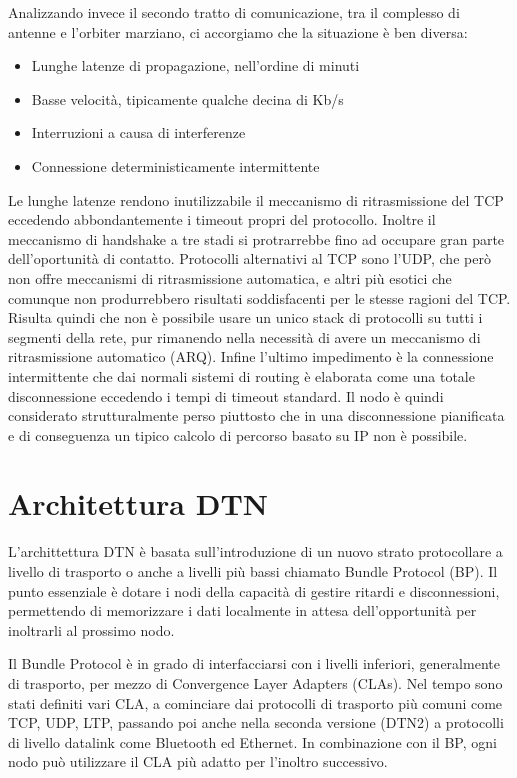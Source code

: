 \documentclass[12pt,a4paper,oneside]{book}
\begin{document}
		Analizzando invece il secondo tratto di comunicazione, tra il complesso di antenne e l'orbiter marziano, ci accorgiamo che la situazione è ben diversa:
		\begin{itemize}
			\item Lunghe latenze di propagazione, nell'ordine di minuti
			\item Basse velocità, tipicamente qualche decina di Kb/s
			\item Interruzioni a causa di interferenze
			\item Connessione deterministicamente intermittente
		\end{itemize}
		Le lunghe latenze rendono inutilizzabile il meccanismo di ritrasmissione del TCP eccedendo abbondantemente i timeout propri del protocollo. Inoltre il meccanismo di handshake a tre stadi si protrarrebbe fino ad occupare gran parte dell'oportunità di contatto. Protocolli alternativi al TCP sono l'UDP, che però non offre meccanismi di ritrasmissione automatica, e altri più esotici che comunque non produrrebbero risultati soddisfacenti per le stesse ragioni del TCP.
		Risulta quindi che non è possibile usare un unico stack di protocolli su tutti i segmenti della rete, pur rimanendo nella necessità di avere un meccanismo di ritrasmissione automatico (ARQ). 
		Infine l'ultimo impedimento è la connessione intermittente che dai normali sistemi di routing è elaborata come una totale disconnessione eccedendo i tempi di timeout standard. Il nodo è quindi considerato strutturalmente perso piuttosto che in una disconnessione pianificata e di conseguenza un tipico calcolo di percorso basato su IP non è possibile.
		
		
		\section{Architettura DTN}		
		
		L'archittettura DTN è basata sull'introduzione di un nuovo strato protocollare a livello di trasporto o anche a livelli più bassi chiamato Bundle Protocol (BP). Il punto essenziale è dotare i nodi della capacità di gestire ritardi e disconnessioni, permettendo di memorizzare i dati localmente in attesa dell'opportunità per inoltrarli al prossimo nodo. 
		
		Il Bundle Protocol è in grado di interfacciarsi con i livelli inferiori, generalmente di trasporto, per mezzo di Convergence Layer Adapters (CLAs). Nel tempo sono stati definiti vari CLA, a cominciare dai protocolli di trasporto più comuni come TCP, UDP, LTP, passando poi anche nella seconda versione (DTN2) a protocolli di livello datalink come Bluetooth ed Ethernet. 
		In combinazione con il BP, ogni nodo può utilizzare il CLA più adatto per l'inoltro successivo. 
		
\end{document}
